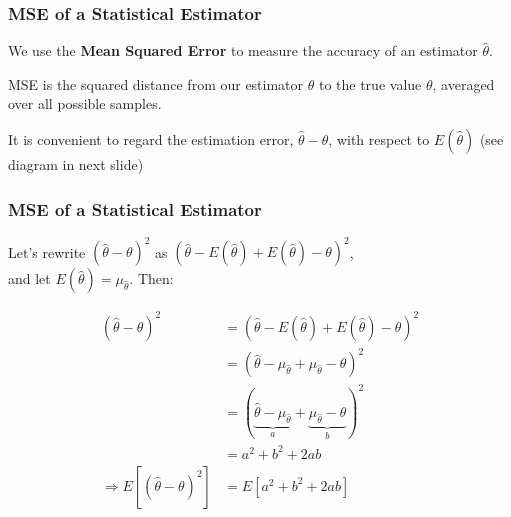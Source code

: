 \documentclass[12pt]{beamer}\usepackage[]{graphicx}\usepackage[]{color}
\begin{document}
\begin{frame}
\frametitle{MSE of a Statistical Estimator}

We use the \textbf{Mean Squared Error} to measure the accuracy 
of an estimator $\hat{\theta}$.

\bigskip
MSE is the squared distance from our estimator $\hat{\theta}$ to the true value
$\theta$, averaged over all possible samples.

\bigskip
It is convenient to regard the estimation error, $\hat{\theta} - \theta$, with respect 
to $E(\hat{\theta})$ {\lolit (see diagram in next slide)}

\end{frame}


\begin{frame}
\frametitle{}
\begin{center}
\end{center}
\end{frame}


\begin{frame}
\frametitle{MSE of a Statistical Estimator}

Let's rewrite $(\hat{\theta} - \theta)^2$ as $( \hat{\theta} - E(\hat{\theta}) + E(\hat{\theta}) - \theta)^2$, \\ and let $E(\hat{\theta}) = \mu_{\hat{\theta}}$. Then:

\begin{align*}
(\hat{\theta} - \theta)^2 &= \left ( \hat{\theta} - E(\hat{\theta}) + E(\hat{\theta}) - \theta \right )^2 \\
&= ( \hat{\theta} - \mu_{\hat{\theta}} + \mu_{\hat{\theta}} - \theta )^2 \\
&= (\underbrace{\hat{\theta} - \mu_{\hat{\theta}}}_{a} + \underbrace{\mu_{\hat{\theta}} - \theta}_{b})^2 \\
&= a^2 + b^2 + 2ab \\
\Longrightarrow E \left [ (\hat{\theta} - \theta)^2 \right ] &= E[a^2 + b^2 + 2ab]
\end{align*}

\end{frame}

\end{document}
